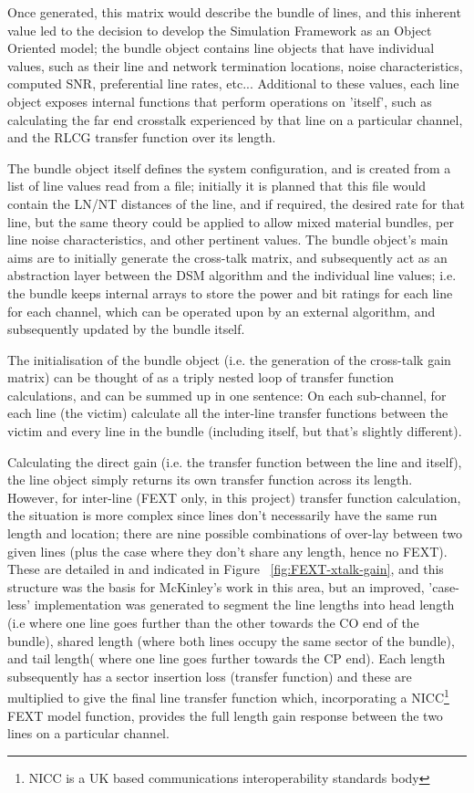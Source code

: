 Once generated, this matrix would describe the bundle of lines, and this inherent value led to the decision to develop the Simulation Framework as an Object Oriented model; the bundle object contains line objects that have individual values, such as their line and network termination locations, noise characteristics, computed SNR, preferential line rates, etc... Additional to these values, each line object exposes internal functions that perform operations on 'itself', such as calculating the far end crosstalk experienced by that line on a particular channel, and the RLCG transfer function over its length. 

The bundle object itself defines the system configuration, and is created from a list of line values read from a file; initially it is planned that this file would contain the LN/NT distances of the line, and if required, the desired rate for that line, but the same theory could be applied to allow mixed material bundles, per line noise characteristics, and other pertinent values. The bundle object's main aims are to initially generate the cross-talk matrix, and subsequently act as an abstraction layer between the DSM algorithm and the individual line values; i.e. the bundle keeps internal arrays to store the power and bit ratings for each line for each channel, which can be operated upon by an external algorithm, and subsequently updated by the bundle itself.

The initialisation of the bundle object (i.e. the generation of the cross-talk gain matrix) can be thought of as a triply nested loop of transfer function calculations, and can be summed up in one sentence: On each sub-channel, for each line (the victim) calculate all the inter-line transfer functions between the victim and every line in the bundle (including itself, but that’s slightly different).

Calculating the direct gain (i.e. the transfer function between the line and itself), the line object simply returns its own transfer function across its length. However, for inter-line (FEXT only, in this project) transfer function calculation, the situation is more complex since lines don't necessarily have the same run length and location; there are nine possible combinations of over-lay between two given lines (plus the case where they don't share any length, hence no FEXT). These are detailed in \cite{RB03} and indicated in Figure ~\ref{fig:FEXT-xtalk-gain}, and this structure was the basis for McKinley's work in this area, but an improved, 'case-less' implementation was generated to segment the line lengths into head length (i.e where one line goes further than the other towards the CO end of the bundle), shared length (where both lines occupy the same sector of the bundle), and tail length( where one line goes further towards the CP end). Each length subsequently has a sector insertion loss (transfer function) and these are multiplied to give the final line transfer function which, incorporating a NICC\footnote{NICC is a UK based communications interoperability standards body} FEXT model function, provides the full length gain response between the two lines on a particular channel.

